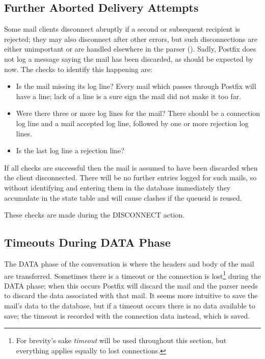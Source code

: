 \subsection{Further Aborted Delivery Attempts}

Some mail clients disconnect abruptly if a second or subsequent recipient
is rejected; they may also disconnect after other errors, but such
disconnections are either unimportant or are handled elsewhere in the
parser ().  Sadly, Postfix does not
log a message saying the mail has been discarded, as should be expected by
now.  The checks to identify this happening are:

\begin{itemize}

    \item Is the mail missing its  log line?  Every mail
        which passes through Postfix will have a  line;
        lack of a  line is a sure sign the mail did not
        make it too far.

    \item Were there three or more  log lines for the mail?
        There should be a connection log line and a mail accepted log line,
        followed by one or more rejection log lines.

    \item Is the last  log line a rejection line?

\end{itemize}

If all checks are successful then the mail is assumed to have been
discarded when the client disconnected.  There will be no further entries
logged for such mails, so without identifying and entering them in the
database immediately they accumulate in the state table and will cause
clashes if the queueid is reused.

These checks are made during the DISCONNECT action.

\subsection{Timeouts During DATA Phase}

\label{timeouts during data phase}

The DATA phase of the  conversation is where the headers and
body of the mail are transferred.  Sometimes there is a timeout or the
connection is lost\footnote{For brevity's sake \textit{timeout\/} will be
used throughout this section, but everything applies equally to lost
connections.} during the DATA phase; when this occurs Postfix will discard
the mail and the parser needs to discard the data associated with that
mail.  It seems more intuitive to save the mail's data to the database, but
if a timeout occurs there is no data available to save; the timeout is
recorded with the connection data instead, which is saved.

